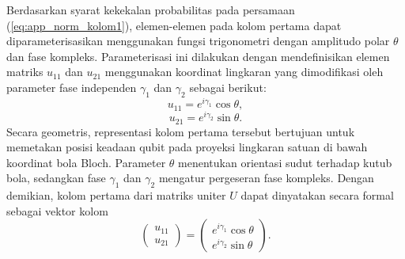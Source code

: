 Berdasarkan syarat kekekalan probabilitas pada persamaan (\ref{eq:app_norm_kolom1}), elemen-elemen pada kolom pertama dapat diparameterisasikan menggunakan fungsi trigonometri dengan amplitudo polar $\theta$ dan fase kompleks. Parameterisasi ini dilakukan dengan mendefinisikan elemen matriks $u_{11}$ dan $u_{21}$ menggunakan koordinat lingkaran yang dimodifikasi oleh parameter fase independen $\gamma_1$ dan $\gamma_2$ sebagai berikut:
\begin{equation}
\label{eq:app_param_u11}
u_{11} = e^{i\gamma_1} \cos\theta,
\end{equation}
\begin{equation}
\label{eq:app_param_u21}
u_{21} = e^{i\gamma_2} \sin\theta.
\end{equation}
Secara geometris, representasi kolom pertama tersebut bertujuan untuk memetakan posisi keadaan qubit pada proyeksi lingkaran satuan di bawah koordinat bola Bloch. Parameter $\theta$ menentukan orientasi sudut terhadap kutub bola, sedangkan fase $\gamma_1$ dan $\gamma_2$ mengatur pergeseran fase kompleks. Dengan demikian, kolom pertama dari matriks uniter $U$ dapat dinyatakan secara formal sebagai vektor kolom
\begin{equation}
\label{eq:app_vektor_kolom1}
\begin{pmatrix} u_{11} \\ u_{21} \end{pmatrix} = \begin{pmatrix} e^{i\gamma_1} \cos\theta \\ e^{i\gamma_2} \sin\theta \end{pmatrix}.
\end{equation}

